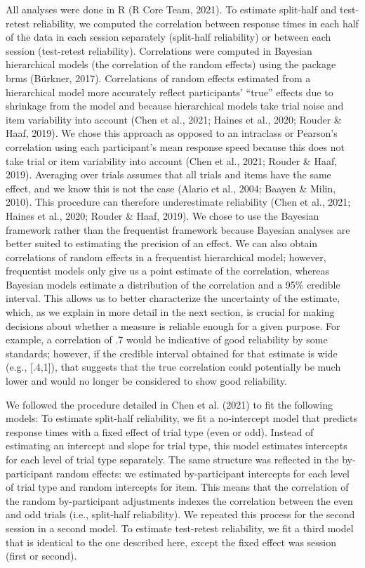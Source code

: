 \documentclass[
  man,floatsintext]{apa6}
\begin{document}
All analyses were done in R (R Core Team, 2021). To estimate split-half and test-retest reliability, we computed the correlation between response times in each half of the data in each session separately (split-half reliability) or between each session (test-retest reliability). Correlations were computed in Bayesian hierarchical models (the correlation of the random effects) using the package brms (Bürkner, 2017). Correlations of random effects estimated from a hierarchical model more accurately reflect participants' ``true'' effects due to shrinkage from the model and because hierarchical models take trial noise and item variability into account (Chen et al., 2021; Haines et al., 2020; Rouder \& Haaf, 2019). We chose this approach as opposed to an intraclass or Pearson's correlation using each participant's mean response speed because this does not take trial or item variability into account (Chen et al., 2021; Rouder \& Haaf, 2019). Averaging over trials assumes that all trials and items have the same effect, and we know this is not the case (Alario et al., 2004; Baayen \& Milin, 2010). This procedure can therefore underestimate reliability (Chen et al., 2021; Haines et al., 2020; Rouder \& Haaf, 2019). We chose to use the Bayesian framework rather than the frequentist framework because Bayesian analyses are better suited to estimating the precision of an effect. We can also obtain correlations of random effects in a frequentist hierarchical model; however, frequentist models only give us a point estimate of the correlation, whereas Bayesian models estimate a distribution of the correlation and a 95\% credible interval. This allows us to better characterize the uncertainty of the estimate, which, as we explain in more detail in the next section, is crucial for making decisions about whether a measure is reliable enough for a given purpose. For example, a correlation of .7 would be indicative of good reliability by some standards; however, if the credible interval obtained for that estimate is wide (e.g., {[}.4,1{]}), that suggests that the true correlation could potentially be much lower and would no longer be considered to show good reliability.

We followed the procedure detailed in Chen et al. (2021) to fit the following models: To estimate split-half reliability, we fit a no-intercept model that predicts response times with a fixed effect of trial type (even or odd). Instead of estimating an intercept and slope for trial type, this model estimates intercepts for each level of trial type separately. The same structure was reflected in the by-participant random effects: we estimated by-participant intercepts for each level of trial type and random intercepts for item. This means that the correlation of the random by-participant adjustments indexes the correlation between the even and odd trials (i.e., split-half reliability). We repeated this process for the second session in a second model. To estimate test-retest reliability, we fit a third model that is identical to the one described here, except the fixed effect was session (first or second).
\end{document}
